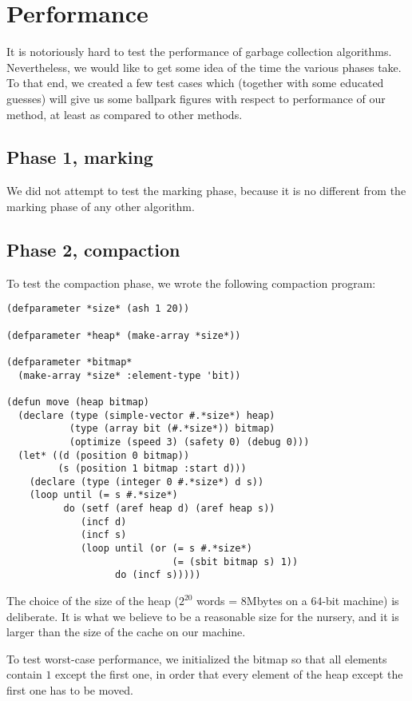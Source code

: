 \section{Performance}

It is notoriously hard to test the performance of garbage collection
algorithms.  Nevertheless, we would like to get some idea of the time
the various phases take.  To that end, we created a few test cases
which (together with some educated guesses) will give us some ballpark
figures with respect to performance of our method, at least as
compared to other methods. 

\subsection{Phase 1, marking}

We did not attempt to test the marking phase, because it is no
different from the marking phase of any other algorithm.

\subsection{Phase 2, compaction}

To test the compaction phase, we wrote the following compaction
program:

{\small\begin{verbatim}
(defparameter *size* (ash 1 20))

(defparameter *heap* (make-array *size*))

(defparameter *bitmap*
  (make-array *size* :element-type 'bit))

(defun move (heap bitmap)
  (declare (type (simple-vector #.*size*) heap)
           (type (array bit (#.*size*)) bitmap)
           (optimize (speed 3) (safety 0) (debug 0)))
  (let* ((d (position 0 bitmap))
         (s (position 1 bitmap :start d)))
    (declare (type (integer 0 #.*size*) d s))
    (loop until (= s #.*size*)
          do (setf (aref heap d) (aref heap s))
             (incf d)
             (incf s)
             (loop until (or (= s #.*size*)
                             (= (sbit bitmap s) 1))
                   do (incf s)))))
  \end{verbatim}}

The choice of the size of the heap ($2^{20}$ words = $8$Mbytes on a
$64$-bit machine) is deliberate.  It is what we believe to be a
reasonable size for the nursery, and it is larger than the size of the
cache on our machine.

To test worst-case performance, we initialized the bitmap so that all
elements contain $1$ except the first one, in order that every element
of the heap except the first one has to be moved.  
